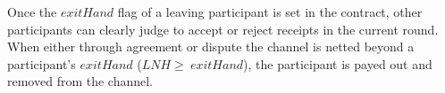 Once the \(exitHand\) flag of a leaving participant is set in the contract, other participants can clearly judge to accept or reject receipts in the current round. When either through agreement or dispute the channel is netted beyond a participant's \(exitHand\) (\(LNH \geq \ exitHand\)), the participant is payed out and removed from the channel. 
